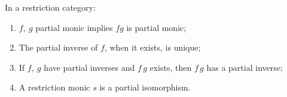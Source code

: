 \begin{lemma}
  \label{lem:rcs_partial_monic_section_inverse_properties}
  In a restriction category:
  \begin{enumerate}[{(}i{)}]
    \item $f,\ g$ partial monic implies $f g$ is partial monic;
    \item The partial inverse of $f$, when it exists, is unique;
    \item If $f,\ g$ have partial inverses and $f\,g$ exists, then $f\,g$ has a partial inverse;
    \item A restriction monic $s$ is a partial isomorphism.
  \end{enumerate}
\end{lemma}

